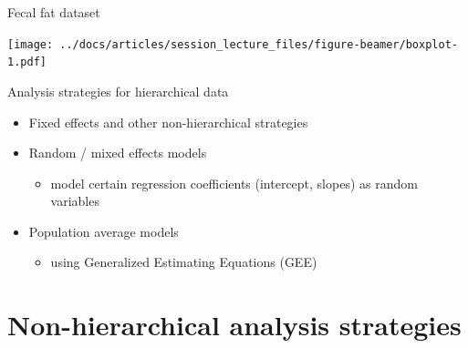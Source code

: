 \documentclass[
  ignorenonframetext,
]{beamer}
\providecommand{\tightlist}{%
  \setlength{\itemsep}{0pt}\setlength{\parskip}{0pt}}
\begin{document}
\begin{frame}{Fecal fat dataset}
\protect\hypertarget{fecal-fat-dataset-1}{}

\texttt{[image: ../docs/articles/session\_lecture\_files/figure-beamer/boxplot-1.pdf]}

\end{frame}

\begin{frame}{Analysis strategies for hierarchical data}
\protect\hypertarget{analysis-strategies-for-hierarchical-data}{}

\begin{itemize}
\tightlist
\item
  Fixed effects and other non-hierarchical strategies
\item
  Random / mixed effects models

  \begin{itemize}
  \tightlist
  \item
    model certain regression coefficients (intercept, slopes) as random
    variables
  \end{itemize}
\item
  Population average models

  \begin{itemize}
  \tightlist
  \item
    using Generalized Estimating Equations (GEE)
  \end{itemize}
\end{itemize}

\end{frame}

\hypertarget{non-hierarchical-analysis-strategies}{%
\section{Non-hierarchical analysis
strategies}\label{non-hierarchical-analysis-strategies}}
\end{document}
